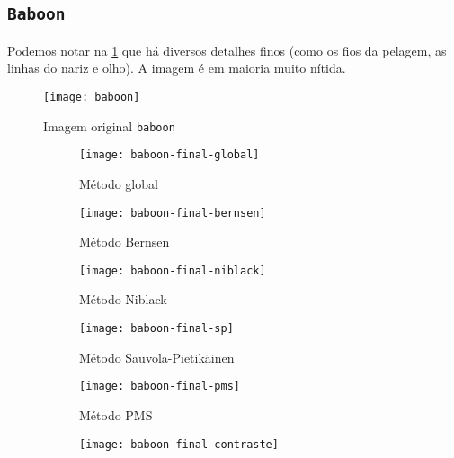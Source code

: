 \documentclass[brazilian,a4paper,twocolumn]{article}
\begin{document}
    \subsection{\texttt{Baboon}}

        Podemos notar na \cref{fig:baboon} que há diversos detalhes finos (como os fios da pelagem, as linhas do nariz e olho). A imagem é em maioria muito nítida.

        \begin{figure}
            \centering
            \texttt{[image: baboon]}
            \caption{Imagem original \texttt{baboon}}
            \label{fig:baboon}
        \end{figure}

        \begin{figure}
            \centering
            \begin{subfigure}{0.23\textwidth}
                \texttt{[image: baboon-final-global]}
                \caption{Método global}
                \label{fig:baboon-global}
            \end{subfigure}
            \begin{subfigure}{0.23\textwidth}
                \texttt{[image: baboon-final-bernsen]}
                \caption{Método Bernsen}
                \label{fig:baboon-bernsen}
            \end{subfigure}
            \begin{subfigure}{0.23\textwidth}
                \texttt{[image: baboon-final-niblack]}
                \caption{Método Niblack}
                \label{fig:baboon-niblack}
            \end{subfigure}
            \begin{subfigure}{0.23\textwidth}
                \texttt{[image: baboon-final-sp]}
                \caption{Método Sauvola-Pietikäinen}
                \label{fig:baboon-sp}
            \end{subfigure}
            \begin{subfigure}{0.23\textwidth}
                \texttt{[image: baboon-final-pms]}
                \caption{Método PMS}
                \label{fig:baboon-pms}
            \end{subfigure}
            \begin{subfigure}{0.23\textwidth}
                \texttt{[image: baboon-final-contraste]}

\end{subfigure}
\end{figure}
\end{document}
